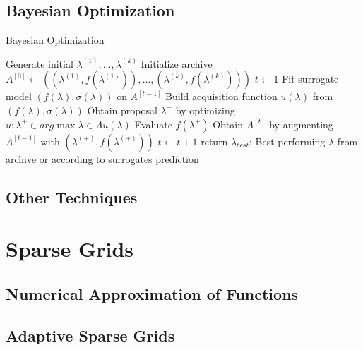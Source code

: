 \subsection{Bayesian Optimization}
\cite{bischl2021hyperparameter}
\begin{algorithm}
	\caption{Bayesian Optimization}\label{alg:bayesian_opt}
	\begin{algorithmic}
		\State Generate initial $\lambda^{(1)}, ..., \lambda^{(k)} $
		\State Initialize archive $A^{[0]} \gets ((\lambda^{(1)}, f(\lambda^{(1)})), ..., (\lambda^{(k)}, f(\lambda^{(k)})))$
		\State $ t \gets 1 $ 
			\State Fit surrogate model $ (f(\lambda), \sigma(\lambda)) $ on $ A^{[t-1]} $
			\State Build acquisition function $ u(\lambda) $ from $ (f(\lambda), \sigma(\lambda)) $
			\State Obtain proposal $ \lambda^{+} $ by optimizing $ u: \lambda^+ \in arg\max{\lambda \in \Lambda} u(\lambda) $
			\State Evaluate $ f(\lambda^+)$
			\State Obtain $A^[t]$ by augmenting $ A^{[t-1]} $ with $ (\lambda^{(+)}, f(\lambda^{(+)})) $
			\State $ t \gets t+1 $
		\EndWhile
		\State return $ \lambda_{best} $: Best-performing $\lambda$ from archive or according to surrogates prediction
	\end{algorithmic}
\end{algorithm}



\subsection{Other Techniques}


\section{Sparse Grids}

\subsection{Numerical Approximation of Functions}

\subsection{Adaptive Sparse Grids}
